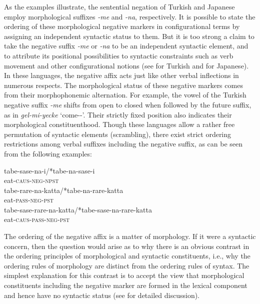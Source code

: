 \documentclass[output=paper
                ,modfonts
                ,nonflat
	        ,collection
	        ,collectionchapter
	        ,collectiontoclongg
 	        ,biblatex
                ,babelshorthands
                ,newtxmath
                ,draftmode
                ,colorlinks, citecolor=brown
]{./langsci/langscibook}
\begin{document}
{\begin{exe}
\begin{xlist}
\begin{exe}
\begin{xlist}
\noindent
As the examples illustrate, the sentential negation of Turkish and Japanese employ
morphological suffixes \textit{-me} and \textit{-na},
respectively.
It is possible to state the ordering
of these morphological negative markers in configurational
terms by assigning an independent syntactic status to them.
But it is too strong a claim to
take the negative suffix \textit{-me} or \textit{-na}  to be an independent syntactic element,
and to attribute its positional possibilities to syntactic constraints
such as verb movement and other configurational notions (see \citealt{kelepir} for
Turkish and \citealt{Kato:97,Kato:00} for Japanese).
%
In these languages, the negative affix acts just like
other verbal inflections in numerous respects.
%
%
%
%
%
The morphological status of
these negative markers comes from their morphophonemic alternation.
For example, the vowel of the Turkish negative suffix \textit{-me} shifts from open to closed when followed by the
future suffix, as in \textit{gel-mi-yecke} `come-\NEG-\FUT'.  Their
strictly fixed position also indicates their morphological
constituenthood. Though these languages allow a rather free permutation of
syntactic elements (scrambling), there exist strict ordering restrictions among
verbal suffixes including the negative suffix, as can be seen from
the following examples:

\eal
\ex
\gll tabe-sase-na-i/*tabe-na-sase-i \\
     eat-\textsc{caus}-\textsc{neg}-\textsc{npst} \\

\ex
\gll tabe-rare-na-katta/*tabe-na-rare-katta \\
     eat-\textsc{pass}-\textsc{neg}-\textsc{pst} \\

\ex
\gll tabe-sase-rare-na-katta/*tabe-sase-na-rare-katta \\
     eat-\textsc{caus}-\textsc{pass}-\textsc{neg}-\textsc{pst} \\
\zl

\noindent
The ordering of the negative affix is a matter of morphology.
If it were a syntactic concern, then
the question would arise as to why
there is an obvious contrast in the ordering principles
of morphological and syntactic constituents, i.e., why the ordering
rules of morphology are distinct from the ordering rules of syntax. The
simplest explanation for this contrast is to accept
the view that morphological constituents including the negative marker
are formed in the lexical component and hence have no syntactic
status (see \citealt{Kim:00} for detailed discussion).


\end{xlist}
\end{exe}
\end{xlist}
\end{exe}}
\end{document}
